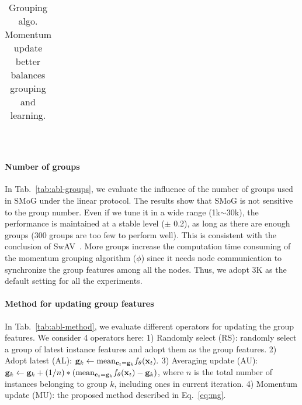 \documentclass[runningheads]{style/llncs}
\begin{document}
\begin{table}
\begin{subtable}[t]{0.33\linewidth}
{\begin{tabular}{ l|c }
		\end{tabular}}
	\end{subtable}
	~
	\begin{subtable}[t]{0.45\linewidth}
		\centering
		\caption{Grouping algo. Momentum update better balances grouping and learning.}
		\label{tab:abl-method}
	\end{subtable}
	\label{tab:abl}
\end{table}

\paragraph{Number of groups}
In Tab.~\ref{tab:abl-groups}, we evaluate the influence of the number of groups used in SMoG under the linear protocol. The results show that SMoG is not sensitive to the group number. Even if we tune it in a wide range (1k$\sim$30k), the performance is maintained at a stable level ($\pm$ 0.2), as long as there are enough groups (300 groups are too few to perform well). This is consistent with the conclusion of SwAV~\cite{swav}. More groups increase the computation time consuming of the momentum grouping algorithm ($\phi$) since it needs node communication to synchronize the group features among all the nodes. Thus, we adopt 3K as the default setting for all the experiments.

\paragraph{Method for updating group features}
In Tab.~\ref{tab:abl-method}, we evaluate different operators for updating the group features. We consider 4 operators here: 1) Randomly select (RS): randomly select a group of latest instance features and adopt them as the group features. 2) Adopt latest (AL): $\mathbf{g}_k \gets {\rm mean}_{\mathbf{c}_t=\mathbf{g}_k}{f_\theta(\mathbf{x}_t)}.$ 3) Averaging update (AU): 
$\mathbf{g}_k \gets \mathbf{g}_k + (1/n) * ({\rm mean}_{\mathbf{c}_t=\mathbf{g}_k}{f_\theta(\mathbf{x}_t)} - \mathbf{g}_k)$, where $n$ is the total number of instances belonging to group $k$, including ones in current iteration.
4) Momentum update (MU): the proposed method described in Eq.~\ref{eq:mg}.
\end{document}
